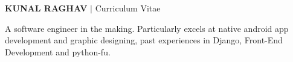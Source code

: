 \documentclass[10pt,a4paper]{extarticle}
\begin{document}
\noindent
	\begin{flushleft}
	\begin{LARGE}
		{
		\color{resumeBlueLight}
			\bfseries{ KUNAL RAGHAV} 
		}$|$ {\color{gray}Curriculum Vitae}\\					
	\end{LARGE}
		\vspace{2mm}
		A software engineer in the making. Particularly excels at native android app development and graphic designing, past
		experiences in Django, Front-End Development and python-fu.
		\vspace{1mm}


\end{flushleft}
\end{document}
